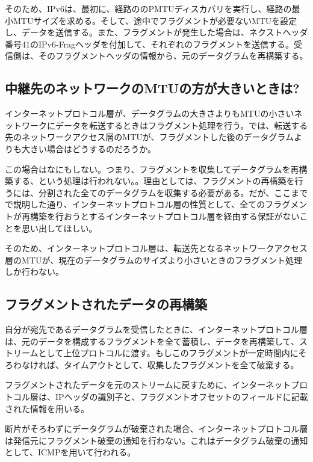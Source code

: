 そのため、IPv6は、最初に、経路ののPMTUディスカバリを実行し、経路の最小MTUサイズを求める。そして、途中でフラグメントが必要ないMTUを設定し、データを送信する。また、フラグメントが発生した場合は、ネクストヘッダ番号41のIPv6-Fragヘッダを付加して、それぞれのフラグメントを送信する。受信側は、そのフラグメントヘッダの情報から、元のデータグラムを再構築する。


\subsection{中継先のネットワークのMTUの方が大きいときは?}

インターネットプロトコル層が、データグラムの大きさよりもMTUの小さいネットワークにデータを転送するときはフラグメント処理を行う。では、転送する先のネットワークアクセス層のMTUが、フラグメントした後のデータグラムよりも大きい場合はどうするのだろうか。

この場合はなにもしない。つまり、フラグメントを収集してデータグラムを再構築する、という処理は行われない。。理由としては、フラグメントの再構築を行うには、分割された全てのデータグラムを収集する必要がある。だが、ここまでで説明した通り、インターネットプロトコル層の性質として、全てのフラグメントが再構築を行おうとするインターネットプロトコル層を経由する保証がないことを思い出してほしい。

そのため、インターネットプロトコル層は、転送先となるネットワークアクセス層のMTUが、現在のデータグラムのサイズより小さいときのフラグメント処理しか行わない。

\subsection{フラグメントされたデータの再構築}

自分が宛先であるデータグラムを受信したときに、インターネットプロトコル層は、元のデータを構成するフラグメントを全て蓄積し、データを再構築して、ストリームとして上位プロトコルに渡す。もしこのフラグメントが一定時間内にそろわなければ、タイムアウトとして、収集したフラグメントを全て破棄する。

フラグメントされたデータを元のストリームに戻すために、インターネットプロトコル層は、IPヘッダの識別子と、フラグメントオフセットのフィールドに記載された情報を用いる。

断片がそろわずにデータグラムが破棄された場合、インターネットプロトコル層は発信元にフラグメント破棄の通知を行わない。これはデータグラム破棄の通知として、ICMPを用いて行われる。

